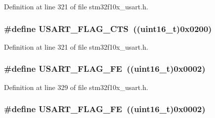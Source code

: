 Definition at line 321 of file stm32f10x\+\_\+usart.\+h.

\subsubsection[{\texorpdfstring{U\+S\+A\+R\+T\+\_\+\+F\+L\+A\+G\+\_\+\+C\+TS}{USART_FLAG_CTS}}]{\setlength{\rightskip}{0pt plus 5cm}\#define U\+S\+A\+R\+T\+\_\+\+F\+L\+A\+G\+\_\+\+C\+TS~(({\bf uint16\+\_\+t})0x0200)}\hypertarget{group___u_s_a_r_t___flags_ga94b7272319cca88a65075d5cb6048441}{}\label{group___u_s_a_r_t___flags_ga94b7272319cca88a65075d5cb6048441}


Definition at line 321 of file stm32f10x\+\_\+usart.\+h.

\subsubsection[{\texorpdfstring{U\+S\+A\+R\+T\+\_\+\+F\+L\+A\+G\+\_\+\+FE}{USART_FLAG_FE}}]{\setlength{\rightskip}{0pt plus 5cm}\#define U\+S\+A\+R\+T\+\_\+\+F\+L\+A\+G\+\_\+\+FE~(({\bf uint16\+\_\+t})0x0002)}\hypertarget{group___u_s_a_r_t___flags_ga3551a32bac49a2ec040e5fdafcc9c4bd}{}\label{group___u_s_a_r_t___flags_ga3551a32bac49a2ec040e5fdafcc9c4bd}


Definition at line 329 of file stm32f10x\+\_\+usart.\+h.

\subsubsection[{\texorpdfstring{U\+S\+A\+R\+T\+\_\+\+F\+L\+A\+G\+\_\+\+FE}{USART_FLAG_FE}}]{\setlength{\rightskip}{0pt plus 5cm}\#define U\+S\+A\+R\+T\+\_\+\+F\+L\+A\+G\+\_\+\+FE~(({\bf uint16\+\_\+t})0x0002)}\hypertarget{group___u_s_a_r_t___flags_ga3551a32bac49a2ec040e5fdafcc9c4bd}{}\label{group___u_s_a_r_t___flags_ga3551a32bac49a2ec040e5fdafcc9c4bd}


